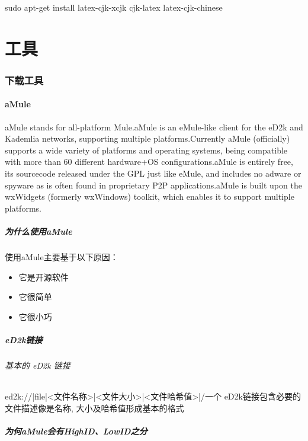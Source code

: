 \documentclass[paper=a4,fontsize=11pt]{article}
\begin{document}
	sudo apt-get install latex-cjk-xcjk cjk-latex latex-cjk-chinese
	
	\clearpage
		
	\part{工具}
	
	\clearpage
	
	\section{下载工具}	
	\subsection{aMule}
	aMule stands for all-platform Mule.aMule is an eMule-like client for the eD2k and Kademlia networks, supporting multiple platforms.Currently aMule (officially) supports a wide variety of platforms and operating systems, being compatible with more than 60 different hardware+OS configurations.aMule is entirely free, its sourcecode released under the GPL just like eMule, and includes no adware or spyware as is often found in proprietary P2P applications.aMule is built upon the wxWidgets (formerly wxWindows) toolkit, which enables it to support multiple platforms.
	\subsubsection{为什么使用aMule}
	使用aMule主要基于以下原因：
	\begin{itemize}
		\item{它是开源软件}
		\item{它很简单}
		\item{它很小巧}
	\end{itemize}
	
	\subsubsection{eD2k链接}

	\paragraph{基本的 eD2k 链接}
	ed2k://|file|<文件名称>|<文件大小>|<文件哈希值>|/一个 eD2k链接包含必要的文件描述像是名称, 大小及哈希值形成基本的格式
	
	\subsubsection{为何aMule会有HighID、LowID之分}
	
\end{document}
